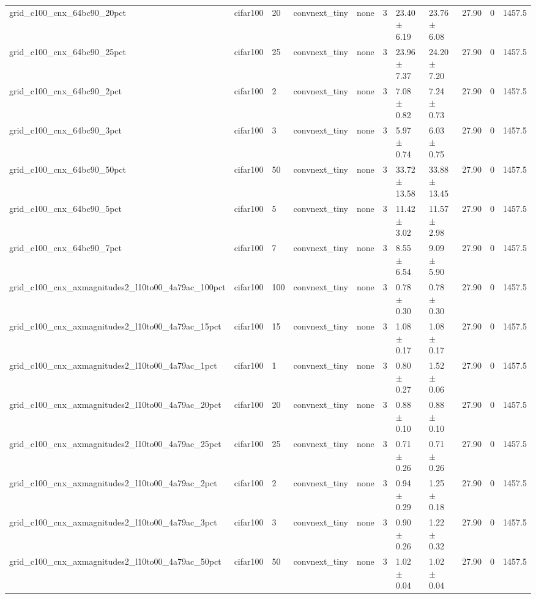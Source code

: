 \begin{tabular}{lllllllllll}
grid_c100_cnx_64bc90_20pct & cifar100 & 20 & convnext_tiny & none & 3 & 23.40 $\pm$ 6.19 & 23.76 $\pm$ 6.08 & 27.90 & 0 & 1457.5 \\
grid_c100_cnx_64bc90_25pct & cifar100 & 25 & convnext_tiny & none & 3 & 23.96 $\pm$ 7.37 & 24.20 $\pm$ 7.20 & 27.90 & 0 & 1457.5 \\
grid_c100_cnx_64bc90_2pct & cifar100 & 2 & convnext_tiny & none & 3 & 7.08 $\pm$ 0.82 & 7.24 $\pm$ 0.73 & 27.90 & 0 & 1457.5 \\
grid_c100_cnx_64bc90_3pct & cifar100 & 3 & convnext_tiny & none & 3 & 5.97 $\pm$ 0.74 & 6.03 $\pm$ 0.75 & 27.90 & 0 & 1457.5 \\
grid_c100_cnx_64bc90_50pct & cifar100 & 50 & convnext_tiny & none & 3 & 33.72 $\pm$ 13.58 & 33.88 $\pm$ 13.45 & 27.90 & 0 & 1457.5 \\
grid_c100_cnx_64bc90_5pct & cifar100 & 5 & convnext_tiny & none & 3 & 11.42 $\pm$ 3.02 & 11.57 $\pm$ 2.98 & 27.90 & 0 & 1457.5 \\
grid_c100_cnx_64bc90_7pct & cifar100 & 7 & convnext_tiny & none & 3 & 8.55 $\pm$ 6.54 & 9.09 $\pm$ 5.90 & 27.90 & 0 & 1457.5 \\
grid_c100_cnx_axmagnitudes2_l10to00_4a79ac_100pct & cifar100 & 100 & convnext_tiny & none & 3 & 0.78 $\pm$ 0.30 & 0.78 $\pm$ 0.30 & 27.90 & 0 & 1457.5 \\
grid_c100_cnx_axmagnitudes2_l10to00_4a79ac_15pct & cifar100 & 15 & convnext_tiny & none & 3 & 1.08 $\pm$ 0.17 & 1.08 $\pm$ 0.17 & 27.90 & 0 & 1457.5 \\
grid_c100_cnx_axmagnitudes2_l10to00_4a79ac_1pct & cifar100 & 1 & convnext_tiny & none & 3 & 0.80 $\pm$ 0.27 & 1.52 $\pm$ 0.06 & 27.90 & 0 & 1457.5 \\
grid_c100_cnx_axmagnitudes2_l10to00_4a79ac_20pct & cifar100 & 20 & convnext_tiny & none & 3 & 0.88 $\pm$ 0.10 & 0.88 $\pm$ 0.10 & 27.90 & 0 & 1457.5 \\
grid_c100_cnx_axmagnitudes2_l10to00_4a79ac_25pct & cifar100 & 25 & convnext_tiny & none & 3 & 0.71 $\pm$ 0.26 & 0.71 $\pm$ 0.26 & 27.90 & 0 & 1457.5 \\
grid_c100_cnx_axmagnitudes2_l10to00_4a79ac_2pct & cifar100 & 2 & convnext_tiny & none & 3 & 0.94 $\pm$ 0.29 & 1.25 $\pm$ 0.18 & 27.90 & 0 & 1457.5 \\
grid_c100_cnx_axmagnitudes2_l10to00_4a79ac_3pct & cifar100 & 3 & convnext_tiny & none & 3 & 0.90 $\pm$ 0.26 & 1.22 $\pm$ 0.32 & 27.90 & 0 & 1457.5 \\
grid_c100_cnx_axmagnitudes2_l10to00_4a79ac_50pct & cifar100 & 50 & convnext_tiny & none & 3 & 1.02 $\pm$ 0.04 & 1.02 $\pm$ 0.04 & 27.90 & 0 & 1457.5 \\

\end{tabular}
